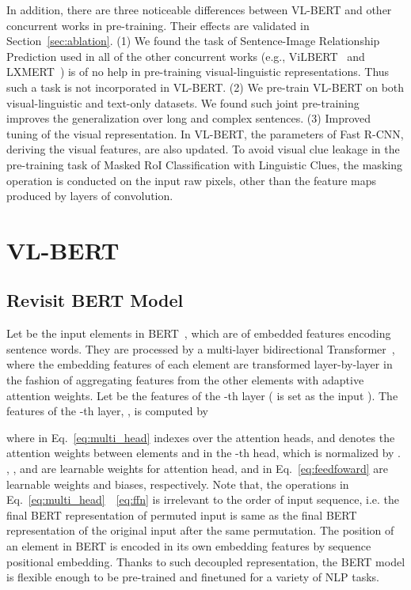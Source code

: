 \documentclass{article} \usepackage{iclr2020_conference,times}
\begin{document}
In addition, there are three noticeable differences between VL-BERT and other concurrent works in pre-training. Their effects are validated in Section~\ref{sec:ablation}. (1) We found the task of Sentence-Image Relationship Prediction used in all of the other concurrent works (e.g., ViLBERT~\citep{lu2019vilbert} and LXMERT~\citep{tan2019lxmert}) is of no help in pre-training visual-linguistic representations. Thus such a task is not incorporated in VL-BERT. (2) We pre-train VL-BERT on both visual-linguistic and text-only datasets. We found such joint pre-training improves the generalization over long and complex sentences. (3) Improved tuning of the visual representation. In VL-BERT, the parameters of Fast R-CNN, deriving the visual features, are also updated. To avoid visual clue leakage in the pre-training task of Masked RoI Classification with Linguistic Clues, the masking operation is conducted on the input raw pixels, other than the feature maps produced by layers of convolution.

 \section{VL-BERT}
\subsection{Revisit BERT Model}


Let  be the input elements in BERT~\citep{devlin2018bert}, which are of embedded features encoding sentence words. They are processed by a multi-layer bidirectional Transformer~\citep{vaswani2017transformer}, where the embedding features of each element are transformed layer-by-layer in the fashion of aggregating features from the other elements with adaptive attention weights. Let  be the features of the -th layer ( is set as the input ). The features of the -th layer, , is computed by

where  in Eq.~\ref{eq:multi_head}  indexes over the attention heads, and  denotes the attention weights between elements  and  in the -th head, which is normalized by . , ,  and  are learnable weights for  attention head,  and  in Eq.~\ref{eq:feedfoward} are learnable weights and biases, respectively. Note that, the operations in Eq.~\ref{eq:multi_head}~~\ref{eq:ffn} is irrelevant to the order of input sequence, i.e. the final BERT representation of permuted input is same as the final BERT representation of the original input after the same permutation. The position of an element in BERT is encoded in its own embedding features by sequence positional embedding. Thanks to such decoupled representation, the BERT model is flexible enough to be pre-trained and finetuned for a variety of NLP tasks.
\end{document}
